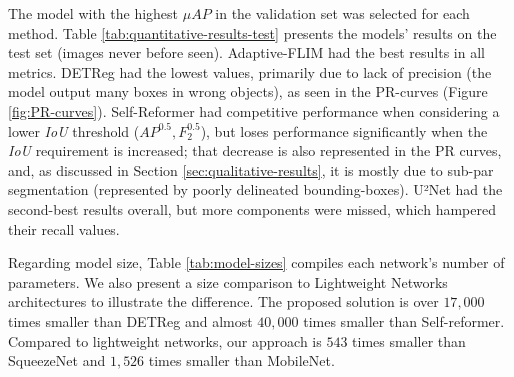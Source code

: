 \documentclass[times,twocolumn,final,authoryear]{elsarticle}
\begin{document}
    The model with the highest $\mu AP$ in the validation set was selected for each method. Table \ref{tab:quantitative-results-test} presents the models' results on the test set (images never before seen). Adaptive-FLIM had the best results in all metrics. DETReg had the lowest values, primarily due to lack of precision (the model output many boxes in wrong objects), as seen in the PR-curves (Figure \ref{fig:PR-curves}). Self-Reformer had competitive performance when considering a lower \textit{IoU} threshold ($AP^{0.5}, F^{0.5}_2$), but loses performance significantly when the \textit{IoU} requirement is increased; that decrease is also represented in the PR curves, and, as discussed in Section \ref{sec:qualitative-results}, it is mostly due to sub-par segmentation (represented by poorly delineated bounding-boxes). U²Net had the second-best results overall, but more components were missed, which hampered their recall values.
    
    Regarding model size, Table \ref{tab:model-sizes} compiles each network's number of parameters. We also present a size comparison to Lightweight Networks architectures to illustrate the difference. The proposed solution is over $17,000$ times smaller than DETReg and almost $40,000$ times smaller than Self-reformer. Compared to lightweight networks, our approach is $543$ times smaller than SqueezeNet and $1,526$ times smaller than MobileNet.
    
\end{document}
